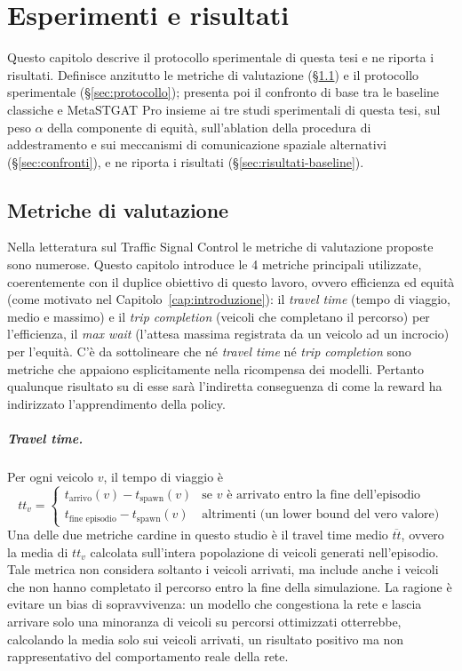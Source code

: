\chapter{Esperimenti e risultati}
\label{cap:confronto}

Questo capitolo descrive il protocollo sperimentale di questa tesi e ne
riporta i risultati. Definisce anzitutto le metriche di valutazione
(§\ref{sec:metriche}) e il protocollo sperimentale
(§\ref{sec:protocollo}); presenta poi il confronto di base tra le
baseline classiche e MetaSTGAT Pro insieme ai tre studi sperimentali di
questa tesi, sul peso $\alpha$ della componente di equità, sull'ablation
della procedura di addestramento e sui meccanismi di comunicazione
spaziale alternativi (§\ref{sec:confronti}), e ne riporta i risultati
(§\ref{sec:risultati-baseline}).

\section{Metriche di valutazione}
\label{sec:metriche}

Nella letteratura sul Traffic Signal Control le metriche di valutazione
proposte sono numerose.
Questo capitolo introduce le 4 metriche principali utilizzate, coerentemente con il duplice obiettivo di
questo lavoro, ovvero efficienza ed equità (come motivato nel Capitolo~\ref{cap:introduzione}):
il \emph{travel time} (tempo di viaggio, medio e massimo) e il \emph{trip completion} (veicoli che
completano il percorso) per l'efficienza, il \emph{max wait} (l'attesa
massima registrata da un veicolo ad un incrocio) per l'equità.
C'è da sottolineare che né \emph{travel time} né
\emph{trip completion} sono metriche che appaiono esplicitamente nella
ricompensa dei modelli. Pertanto qualunque risultato su di esse sarà
l'indiretta conseguenza di come la reward ha indirizzato l'apprendimento
della policy.

\paragraph{Travel time.} Per ogni veicolo $v$, il tempo di viaggio è
\begin{equation}
  tt_v =
  \begin{cases}
    t_{\text{arrivo}}(v) - t_{\text{spawn}}(v)     & \text{se } v \text{ è arrivato entro la fine dell'episodio} \\
    t_{\text{fine episodio}} - t_{\text{spawn}}(v) & \text{altrimenti (un lower bound del vero valore)}
  \end{cases}
\end{equation}
Una delle due metriche cardine in questo studio è il travel time medio $\overline{tt}$,
ovvero la media di $ tt_v $ calcolata sull'intera popolazione di veicoli generati nell'episodio.
Tale metrica non considera soltanto i veicoli arrivati, ma include anche i
veicoli che non hanno completato il percorso entro la fine della simulazione.
La ragione è evitare un bias di sopravvivenza: un
modello che congestiona la rete e lascia arrivare solo una minoranza di
veicoli su percorsi ottimizzati otterrebbe, calcolando la media solo sui
veicoli arrivati, un risultato positivo ma non rappresentativo del comportamento reale della rete.

